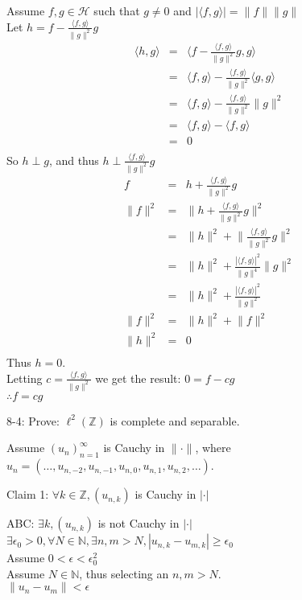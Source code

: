 \documentclass[letterpaper,12pt,fleqn]{article}
\newcommand{\abs}[1]{\left|#1\right|}
\newcommand{\norm}[1]{\lVert#1\rVert}
\newcommand{\inner}[2]{\langle#1,#2\rangle}
\newcommand{\hilb}{\mathcal{H}}
\newcommand{\Z}{\mathbb{Z}}
\newcommand{\N}{\mathbb{N}}
\newcommand{\ltwoz}{\ell^2(\Z)}
\begin{document}
\begin{description}
\begin{theproof}
Assume $f,g\in\hilb$ such that $g\ne0$ and
    $\abs{\inner{f}{g}}=\norm{f}\norm{g}$ \\
Let $h=f-\frac{\inner{f}{g}}{\norm{g}^2}g$ \\
\begin{eqnarray*}
\inner{h}{g} &=& \inner{f-\frac{\inner{f}{g}}{\norm{g}^2}g}{g} \\
    &=& \inner{f}{g}-\frac{\inner{f}{g}}{\norm{g}^2}\inner{g}{g} \\
    &=& \inner{f}{g}-\frac{\inner{f}{g}}{\norm{g}^2}\norm{g}^2 \\
    &=& \inner{f}{g}-\inner{f}{g} \\
    &=& 0 \\
\end{eqnarray*}
So $h\perp g$, and thus $h\perp\frac{\inner{f}{g}}{\norm{g}^2}g$
\begin{eqnarray*}
f &=& h+\frac{\inner{f}{g}}{\norm{g}^2}g\\
\norm{f}^2 &=& \norm{h+\frac{\inner{f}{g}}{\norm{g}^2}g}^2 \\
    &=& \norm{h}^2+\norm{\frac{\inner{f}{g}}{\norm{g}^2}g}^2 \\
    &=& \norm{h}^2+\frac{\abs{\inner{f}{g}}^2}{\norm{g}^4}\norm{g}^2 \\
    &=& \norm{h}^2+\frac{\abs{\inner{f}{g}}^2}{\norm{g}^2} \\
\norm{f}^2 &=& \norm{h}^2+\norm{f}^2 \\
\norm{h}^2 &=& 0 \\
\end{eqnarray*}
Thus $h=0$. \\
Letting $c=\frac{\inner{f}{g}}{\norm{g}^2}$ we get the result:
$0=f-cg$ \\
$\therefore f=cg$
\end{theproof}

\item{8-4:} Prove: $\ltwoz$ is complete and separable.

Assume $(u_n)_{n=1}^{\infty}$ is Cauchy in $\norm{\cdot}$, where
$u_n=(\ldots, u_{n,-2}, u_{n,-1}, u_{n,0}, u_{n,1}, u_{n,2}, \ldots)$.

\begin{description}
\item {Claim 1: $\forall k\in\Z, (u_{n,k})$ is Cauchy in $\abs{\cdot}$}
\begin{theproof}
ABC: $\exists k,(u_{n,k})$ is not Cauchy in $\abs{\cdot}$ \\
$\exists\epsilon_0>0,\forall N\in\N,\exists n,m>N,\abs{u_{n,k}-u_{m,k}}\ge
    \epsilon_0$ \\
Assume $0<\epsilon<\epsilon_0^2$ \\
Assume $N\in\N$, thus selecting an $n,m>N$. \\
$\norm{u_n-u_m}<\epsilon$ \\


\end{theproof}
\end{description}
\end{description}
\end{document}
